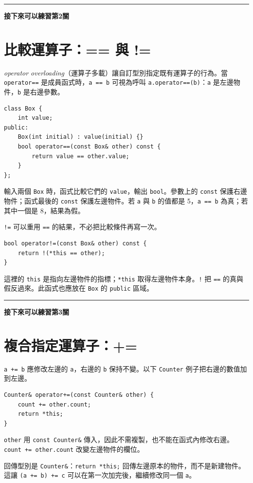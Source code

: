 \documentclass[12pt,a4paper]{article}
\newcommand{\practice}[1]{%
  \Needspace{3\baselineskip}%
  \par\vspace{0.6em}\noindent\rule{\linewidth}{0.3pt}\par
  \noindent\textbf{接下來可以練習第#1關}\par
}
\begin{document}
\practice{2}

\section{比較運算子：== 與 !=}

\emph{operator overloading}（運算子多載）讓自訂型別指定既有運算子的行為。當 \texttt{operator==} 是成員函式時，\texttt{a == b} 可視為呼叫 \texttt{a.operator==(b)}：\texttt{a} 是左邊物件，\texttt{b} 是右邊參數。

\begin{lstlisting}
class Box {
    int value;
public:
    Box(int initial) : value(initial) {}
    bool operator==(const Box& other) const {
        return value == other.value;
    }
};
\end{lstlisting}

輸入兩個 \texttt{Box} 時，函式比較它們的 \texttt{value}，輸出 \texttt{bool}。參數上的 \texttt{const} 保護右邊物件；函式最後的 \texttt{const} 保護左邊物件。若 \texttt{a} 與 \texttt{b} 的值都是 5，\texttt{a == b} 為真；若其中一個是 8，結果為假。

\texttt{!=} 可以重用 \texttt{==} 的結果，不必把比較條件再寫一次。

\begin{lstlisting}
bool operator!=(const Box& other) const {
    return !(*this == other);
}
\end{lstlisting}

這裡的 \texttt{this} 是指向左邊物件的指標；\texttt{*this} 取得左邊物件本身。\texttt{!} 把 \texttt{==} 的真與假反過來。此函式也應放在 \texttt{Box} 的 \texttt{public} 區域。

\practice{3}

\section{複合指定運算子：+=}

\texttt{a += b} 應修改左邊的 \texttt{a}，右邊的 \texttt{b} 保持不變。以下 \texttt{Counter} 例子把右邊的數值加到左邊。

\begin{lstlisting}
Counter& operator+=(const Counter& other) {
    count += other.count;
    return *this;
}
\end{lstlisting}

\texttt{other} 用 \texttt{const Counter\&} 傳入，因此不需複製，也不能在函式內修改右邊。\texttt{count += other.count} 改變左邊物件的欄位。

回傳型別是 \texttt{Counter\&}：\texttt{return *this;} 回傳左邊原本的物件，而不是新建物件。這讓 \texttt{(a += b) += c} 可以在第一次加完後，繼續修改同一個 \texttt{a}。
\end{document}
